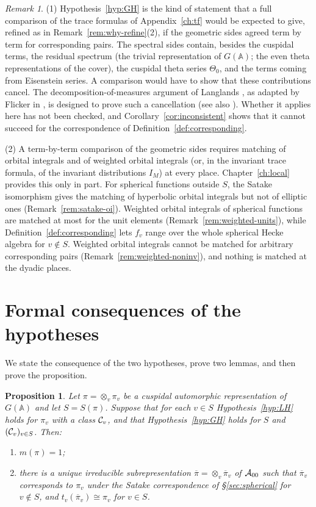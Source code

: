 \documentclass[12pt,letterpaper,openany]{book}
\theoremstyle{plain}
\newtheorem{proposition}[theorem]{Proposition}
\theoremstyle{definition}
\theoremstyle{remark}
\newtheorem{remark}[theorem]{Remark}
\theoremstyle{remark}
\begin{document}
\begin{remark}\label{rem:GH}
(1) Hypothesis~\ref{hyp:GH} is the kind of statement that a full
comparison of the trace formulas of Appendix~\ref{ch:tf} would be expected
to give, refined as in Remark~\ref{rem:why-refine}(2), if the geometric
sides agreed term by term for corresponding pairs. The spectral sides
contain, besides the cuspidal terms, the residual spectrum (the trivial
representation of $G({\mathbb A})$; the even theta representations of the
cover), the cuspidal theta series $\Theta_0$, and the terms coming from
Eisenstein series. A comparison would have to show that these
contributions cancel. The decomposition-of-measures argument of Langlands
\cite{L4}, as adapted by Flicker in \cite[\S\S 4.1--4.2]{Fl}, is designed
to prove such a cancellation (see also \cite[\S\S 10.5, 14.5]{R}). Whether
it applies here has not been checked, and
Corollary~\ref{cor:inconsistent} shows that it cannot succeed for the
correspondence of Definition~\ref{def:corresponding}.

(2) A term-by-term comparison of the geometric sides requires matching
of orbital integrals and of weighted orbital integrals (or, in the
invariant trace formula, of the invariant distributions $I_M$) at every
place. Chapter~\ref{ch:local} provides this only in part. For spherical
functions outside $S$, the Satake isomorphism gives the matching of
hyperbolic orbital integrals but not of elliptic ones
(Remark~\ref{rem:satake-oi}). Weighted orbital integrals of spherical
functions are matched at most for the unit elements
(Remark~\ref{rem:weighted-units}), while Definition~\ref{def:corresponding}
lets $f_v$ range over the whole spherical Hecke algebra for $v\notin S$.
Weighted orbital integrals cannot be matched for arbitrary corresponding
pairs (Remark~\ref{rem:weighted-noninv}), and nothing is matched at the
dyadic places.
\end{remark}

\section{Formal consequences of the hypotheses}\label{sec:main}

We state the consequence of the two hypotheses, prove two lemmas, and then
prove the proposition.

\begin{proposition}\label{thm:main}
Let $\pi=\otimes_v\pi_v$ be a cuspidal automorphic representation of
$G({\mathbb{A}})$ and let $S=S(\pi)$. Suppose that for each $v\in S$
Hypothesis~\ref{hyp:LH} holds for $\pi_v$ with a class ${\cal C}_v$, and
that Hypothesis~\ref{hyp:GH} holds for $S$ and $({\cal C}_v)_{v\in S}$.
Then:
\begin{enumerate}
\item[(a)] $m(\pi)=1$;
\item[(b)] there is a unique irreducible subrepresentation
$\overline{\pi}=\otimes_v\overline{\pi}_v$ of ${\cal A}_{00}$ such that
$\overline{\pi}_v$ corresponds to
$\pi_v$ under the Satake correspondence of \S\ref{sec:spherical} for
$v\notin S$, and $t_v(\overline{\pi}_v)\cong\pi_v$ for $v\in S$.
\end{enumerate}
\end{proposition}
\end{document}
